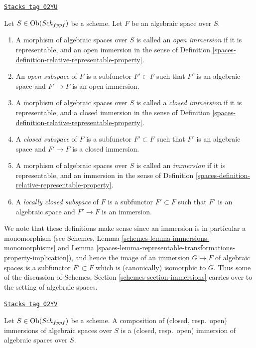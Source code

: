 \begin{definition}[Immersion]
\label{spaces-definition-immersion}
\href{https://stacks.math.columbia.edu/tag/02YU}{\texttt{Stacks tag 02YU}}

Let $S \in \operatorname{Ob}(\mathit{Sch}_{fppf})$ be a scheme.
Let $F$ be an algebraic space over $S$.
\begin{enumerate}
\item A morphism of algebraic spaces over $S$
is called an {\it open immersion} if it is representable, and an open immersion
in the sense of Definition \ref{spaces-definition-relative-representable-property}.
\item An {\it open subspace} of $F$ is a subfunctor $F' \subset F$
such that $F'$ is an algebraic space and $F' \to F$ is an
open immersion.
\item A morphism of algebraic spaces over $S$
is called a {\it closed immersion} if it is representable, and a closed
immersion in the sense of
Definition \ref{spaces-definition-relative-representable-property}.
\item A {\it closed subspace} of $F$ is a subfunctor $F' \subset F$
such that $F'$ is an algebraic space and $F' \to F$ is a
closed immersion.
\item A morphism of algebraic spaces over $S$
is called an {\it immersion} if it is representable, and an immersion
in the sense of Definition \ref{spaces-definition-relative-representable-property}.
\item A {\it locally closed subspace} of $F$ is a subfunctor $F' \subset F$
such that $F'$ is an algebraic space and $F' \to F$ is an
immersion.
\end{enumerate}
\end{definition}

We note that these definitions make sense since an immersion
is in particular a monomorphism (see
Schemes, Lemma \ref{schemes-lemma-immersions-monomorphisms}
and Lemma \ref{spaces-lemma-representable-transformations-property-implication}),
and hence the image of an
immersion $G \to F$ of algebraic spaces is a subfunctor $F' \subset F$
which is (canonically) isomorphic to $G$. Thus some of the discussion
of Schemes, Section \ref{schemes-section-immersions} carries over to the
setting of algebraic spaces.

\begin{lemma}
\label{spaces-lemma-composition-immersions}
\href{https://stacks.math.columbia.edu/tag/02YV}{\texttt{Stacks tag 02YV}}

Let $S \in \operatorname{Ob}(\mathit{Sch}_{fppf})$ be a scheme.
A composition of (closed, resp.\ open) immersions of
algebraic spaces over $S$ is a (closed, resp.\ open)
immersion of algebraic spaces over $S$.
\end{lemma}

